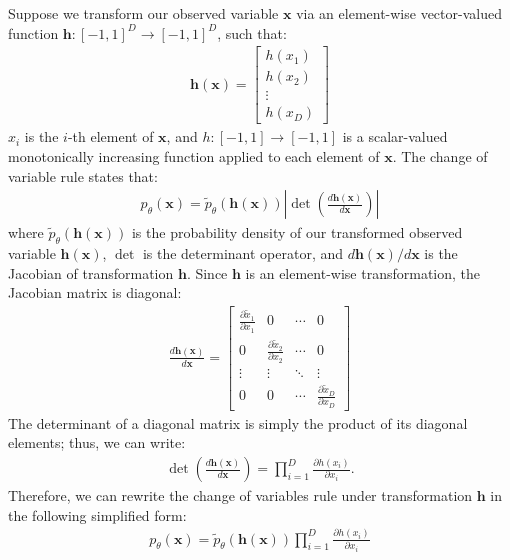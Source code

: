 \documentclass[ oneside,%
                    author={George Herbert},
                    degree={MSci},
                     title={Diffusion Models for Time-Evolving Precipitation Fields},
                  subtitle={}]{dissertation}
\begin{document}
Suppose we transform our observed variable $\mathbf{x}$ via an element-wise vector-valued function $\mathbf{h}:[-1, 1]^D\to[-1,1]^D$, such that:
\begin{align}
      \mathbf{h}(\mathbf{x})=
      \begin{bmatrix}
            h(x_1) \\
            h(x_2) \\
            \vdots \\
            h(x_D)
      \end{bmatrix}
\end{align}
$x_i$ is the $i$-th element of $\mathbf{x}$, and $h:[-1, 1]\to[-1,1]$ is a scalar-valued monotonically increasing function applied to each element of $\mathbf{x}$. The change of variable rule states that:
\begin{align}
      p_\theta(\mathbf{x}) = \tilde{p}_\theta(\mathbf{h}(\mathbf{x}))\left|\det\left(\frac{d \mathbf{h}(\mathbf{x})}{d \mathbf{x}}\right)\right|
\end{align}
where $\tilde{p}_\theta(\mathbf{h}(\mathbf{x}))$ is the probability density of our transformed observed variable $\mathbf{h}(\mathbf{x})$, $\det$ is the determinant operator, and $d\mathbf{h}(\mathbf{x})/d\mathbf{x}$ is the Jacobian of transformation $\mathbf{h}$. Since $\mathbf{h}$ is an element-wise transformation, the Jacobian matrix is diagonal:
\begin{align}
      \frac{d\mathbf{h}(\mathbf{x})}{d\mathbf{x}} =
      \begin{bmatrix}
            \frac{\partial \tilde{x}_1}{\partial x_1} & 0 & \cdots & 0 \\
            0 & \frac{\partial \tilde{x}_2}{\partial x_2} & \cdots & 0 \\
            \vdots & \vdots & \ddots & \vdots \\
            0 & 0 & \cdots & \frac{\partial \tilde{x}_D}{\partial x_D}
      \end{bmatrix}
\end{align}
The determinant of a diagonal matrix is simply the product of its diagonal elements; thus, we can write:
\begin{align}
      \det\left(\frac{d\mathbf{h}(\mathbf{x})}{d\mathbf{x}}\right) = \prod_{i=1}^D \frac{\partial h(x_i)}{\partial x_i}.
\end{align}
Therefore, we can rewrite the change of variables rule under transformation $\mathbf{h}$ in the following simplified form:
\begin{align}
      p_\theta(\mathbf{x}) = \tilde{p}_\theta(\mathbf{h}(\mathbf{x}))\prod_{i=1}^D \frac{\partial h(x_i)}{\partial x_i}
\end{align}
\end{document}
